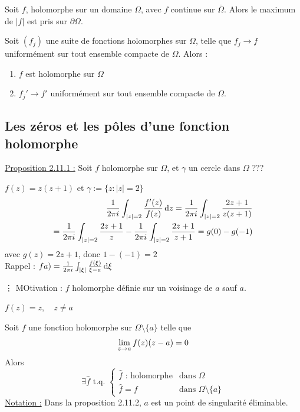 \documentclass[12pt,a4paper]{article}
\begin{document}
 Soit $f$, holomorphe sur un domaine $\Omega$, avec $f$ continue sur $\overline{\Omega}$. Alors le maximum de $|f|$ est pris sur $\partial \Omega$.

\begin{boite}
     Soit $(f_j)$ une suite de fonctions holomorphes sur $\Omega$, telle que $f_j \to f$ uniformément sur tout ensemble compacte de $\Omega$. Alors :
    \begin{enumerate}
        \item $f$ est holomorphe sur $\Omega$
        \item $f_j' \to f'$ uniformément sur tout ensemble compacte de $\Omega$.
\end{enumerate}
\end{boite}

\subsection{Les zéros et les pôles d'une fonction holomorphe}
\uline{Proposition 2.11.1 :} Soit $f$ holomorphe sur $\Omega$, et $\gamma$ un cercle dans $\Omega$ ???

\begin{exemple}
    $f(z) = z(z+1)$ et $\gamma := \{z : |z| = 2\}$
    \begin{align*}
    \frac{1}{2\pi i} \int_{|z|=2}\frac{f'(z)}{f(z)}\, \mathrm d z = \frac{1}{2\pi i}\int_{|z| = 2} \frac{2z+1}{z(z+1)}\\
     = \frac{1}{2\pi i}\int_{|z| = 2}\frac{2z+1}{z} - \frac{1}{2\pi i}\int_{|z| = 2}\frac{2z+1}{z+1} = g(0) - g(-1)
    \end{align*}
    avec $g(z) = 2z+1$, donc $1 - (-1) = 2$\\
    Rappel : $fa) = \frac{1}{2\pi i}\int_{|\xi|} \frac{f(\xi)}{\xi-a}\, \mathrm d \xi$
\end{exemple}
\vdots
MOtivation : $f$ holomorphe définie sur un voisinage de $a$ sauf $a$.
\begin{exemple}
    $f(z) = z,\quad z \neq a$
\end{exemple} 
 Soit $f$ une fonction holomorphe sur $\Omega\setminus\{a\}$ telle que 
\[\lim\limits_{z\to a}f(z)(z-a) = 0\]
Alors 
\[\exists \hat{f} \text{ t.q. } \left\{\begin{array}{ll}
    \hat{f} \text{ : holomorphe} & \text{dans } \Omega\\
    \hat{f} = f & \text{dans } \Omega\setminus\{a\}
\end{array}\right.\]
\uline{Notation :} Dans la proposition 2.11.2, $a$ est un point de singularité éliminable.
\end{document}
